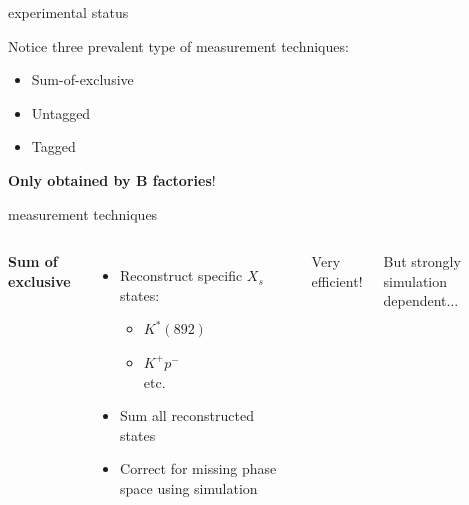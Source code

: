 \documentclass[xcolor=dvipsnames]{beamer}
\begin{document}
\begin{frame}{\safeBtoXsgamma experimental status}
         \vspace{10pt}

         Notice three prevalent type of measurement techniques:
         \begin{itemize}
            \item Sum-of-exclusive
            \item Untagged
            \item Tagged
         \end{itemize}
         \textbf{Only obtained by $\bm{B}$ factories}!
   \end{frame}

   \begin{frame}{\safeBtoXsgamma measurement techniques}
      \begin{columns}
         \centering
         
         \centering
         \textbf{Sum of exclusive}
         \begin{itemize}
            \item Reconstruct specific $X_s$ states:
            \begin{itemize}
               \item $K^*(892)$
               \item $K^+p^-$\\
               etc.
            \end{itemize} 
            \item Sum all reconstructed states
            \item Correct for missing phase space using simulation
         \end{itemize}

         Very efficient!

         But strongly simulation dependent...


      \end{columns}
   \end{frame}
\end{document}
